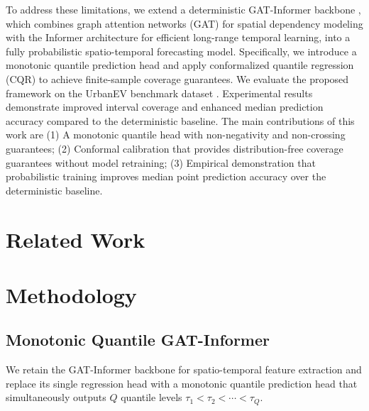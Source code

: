 \documentclass[conference]{IEEEtran}
\begin{document}
To address these limitations, we extend a deterministic GAT-Informer backbone \cite{mine}, which combines graph attention networks (GAT) for spatial dependency modeling with the Informer architecture for efficient long-range temporal learning, into a fully probabilistic spatio-temporal forecasting model. Specifically, we introduce a monotonic quantile prediction head and apply conformalized quantile regression (CQR) to achieve finite-sample coverage guarantees. We evaluate the proposed framework on the UrbanEV benchmark dataset \cite{urbanev}. Experimental results demonstrate improved interval coverage and enhanced median prediction accuracy compared to the deterministic baseline. The main contributions of this work are (1) A monotonic quantile head with non-negativity and non-crossing guarantees; (2) Conformal calibration that provides distribution-free coverage guarantees without model retraining; (3) Empirical demonstration that probabilistic training improves median point prediction accuracy over the deterministic baseline.



\section{Related Work}


\section{Methodology}
\subsection{Monotonic Quantile GAT-Informer}

We retain the GAT-Informer backbone for spatio-temporal feature extraction and replace its single regression head with a monotonic quantile prediction head that simultaneously outputs $Q$ quantile levels $\tau_1 < \tau_2 < \cdots < \tau_Q$.
\end{document}
